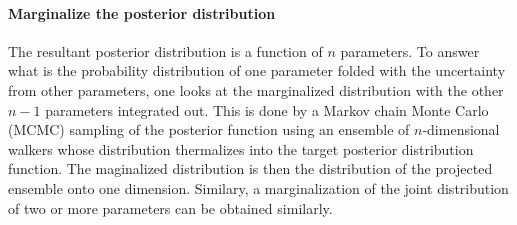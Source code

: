 \paragraph{Marginalize the posterior distribution} The resultant posterior distribution is a function of $n$ parameters.
To answer what is the probability distribution of one parameter folded with the uncertainty from other parameters, one looks at the marginalized distribution with the other $n-1$ parameters integrated out.
This is done by a Markov chain Monte Carlo (MCMC) sampling of the posterior function using an ensemble of $n$-dimensional walkers whose distribution thermalizes into the target posterior distribution function.
The maginalized distribution is then the distribution of the projected ensemble onto one dimension.
Similary, a marginalization of the joint distribution of two or more parameters can be obtained similarly.



